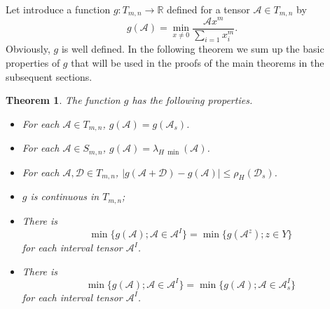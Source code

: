 \documentclass[twoside]{article}
\newtheorem{theorem}{Theorem}[section]
\begin{document}
Let introduce a function $g: T_{m,n}\rightarrow \mathbb{R}$ defined for a tensor $\mathcal{A}\in T_{m,n}$ by
\begin{equation}\label{gx}
g(\mathcal{A})=\min\limits_{x\neq0}\frac{\mathcal{A}x^m}{\sum\limits_{i=1}x_i^{m}}.
\end{equation}
Obviously, $g$ is well defined. In the following theorem we sum up the basic properties of $g$ that will be used in the proofs of the main theorems in the subsequent sections.




\begin{theorem}\label{th1}
The function $g$ has the following properties.
\begin{itemize}
  \item [$(\romannumeral1)$] For each $\mathcal{A}\in T_{m,n}$, $g(\mathcal{A}) =g(\mathcal{A}_s)$.
  \item [$(\romannumeral2)$] For each $\mathcal{A}\in S_{m,n}$, $g( \mathcal{A} )=\lambda_{H~\min} (\mathcal{A})$.
  \item [$(\romannumeral3)$] For each $\mathcal{A},\mathcal{D}\in T_{m,n}$, $|g(\mathcal{A} + \mathcal{D}) -g(\mathcal{A})| \leq\rho_H(\mathcal{D}_s)$.
  \item [$(\romannumeral4)$] $g$ is continuous in $T_{m,n}$;
  \item [$(\romannumeral5)$] There is
  $$\min \{g(\mathcal{A});\mathcal{A}\in \mathcal{A}^I\}=\min \{g(\mathcal{A}^z); z\in Y\}$$
  for each interval tensor $\mathcal{A}^I$.
  \item [$(\romannumeral6)$] There is
  $$\min \{g(\mathcal{A});\mathcal{A}\in \mathcal{A}^I\}=\min \{g(\mathcal{A}); \mathcal{A}\in \mathcal{A}_s^I\}$$
  for each interval tensor $\mathcal{A}^I$.
\end{itemize}
\end{theorem}
\end{document}
